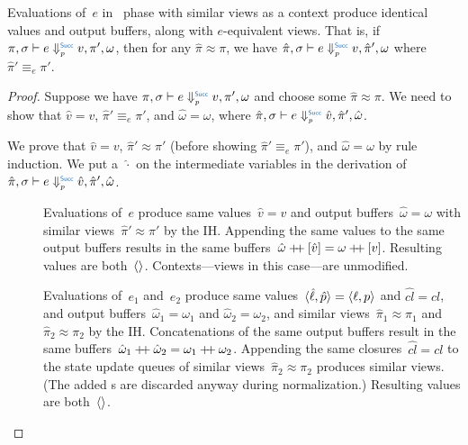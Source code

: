 \begin{lem}\label{lem:simeval}
  Evaluations of~$e$ in~ phase with similar views as a context produce identical values and output buffers, along with $e$-equivalent views.
  That is, if $\Step<\phase{Succ}>[\pi,\sigma]{e}{v,\pi',\omega}$,
  then for any $\hat\pi \approx \pi$, we have
  $\Step<\phase{Succ}>[\hat \pi,\sigma]{e}{v,\hat \pi',\omega}$ where $\hat\pi' \equiv_e \pi'$.
\end{lem}

\begin{proof}
  Suppose we have $\Step<\phase{Succ}>[\pi,\sigma]{e}{v,\pi',\omega}$ and choose some $\hat\pi \approx \pi$.
  We need to show that $\hat v = v$, $\hat\pi' \equiv_e \pi'$, and $\hat\omega = \omega$, where $\Step<\phase{Succ}>[\hat\pi,\sigma]{e}{\hat v,\hat\pi',\hat\omega}$.

  We prove that $\hat v = v$, $\hat\pi' \approx \pi'$ (before showing $\hat\pi' \equiv_e \pi'$), and $\hat\omega = \omega$ by rule induction.
  We put a~$\hat\cdot$ on the intermediate variables in the derivation of~$\Step<\phase{Succ}>[\hat\pi,\sigma]{e}{\hat v,\hat\pi',\hat\omega}$.
  \begin{description}
    \item[{\normalfont{}}]
      Evaluations of~$e$ produce same values~$\hat v = v$ and output buffers~$\hat \omega = \omega$ with similar views~$\hat\pi' \approx \pi'$ by the IH.
      Appending the same values to the same output buffers results in the same buffers~$\hat\omega \mathbin{+\negthickspace+} [\hat v] = \omega \mathbin{+\negthickspace+} [v]$.
      Resulting values are both~$\langle\rangle$.
      Contexts---views in this case---are unmodified.

    \item[{\normalfont{}}]
      Evaluations of~$e_1$ and~$e_2$ produce same values~$\langle\hat\ell, \hat p\rangle = \langle\ell, p\rangle$ and $\hat{cl} = cl$, and output buffers~$\hat\omega_1 = \omega_1$ and $\hat\omega_2 = \omega_2$, and similar views~$\hat\pi_1 \approx \pi_1$ and $\hat\pi_2 \approx \pi_2$ by the IH.
      Concatenations of the same output buffers result in the same buffers~$\hat\omega_1 \mathbin{+\negthickspace+} \hat\omega_2 = \omega_1 \mathbin{+\negthickspace+} \omega_2$.
      Appending the same closures~$\hat{cl} = cl$ to the state update queues of similar views~$\hat\pi_2 \approx \pi_2$ produces similar views.
      (The added s are discarded anyway during normalization.)
      Resulting values are both~$\langle\rangle$.


\end{description}
\end{proof}
